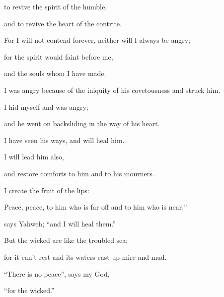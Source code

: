 {\par }{\QB to revive the spirit of the humble,
\par }{\QB and to revive the heart of the contrite.
\par }{\Q {}For I will not contend forever, neither will I always be angry;
\par }{\QB for the spirit would faint before me,
\par }{\QB and the souls whom I have made.
\par }{\Q {}I was angry because of the iniquity of his covetousness and struck him.
\par }{\QB I hid myself and was angry;
\par }{\QB and he went on backsliding in the way of his heart.
\par }{\Q {}I have seen his ways, and will heal him.
\par }{\QB I will lead him also,
\par }{\QB and restore comforts to him and to his mourners.
\par }{\Q {}I create the fruit of the lips:
\par }{\QB Peace, peace, to him who is far off and to him who is near,”
\par }{\QB says Yahweh; “and I will heal them.”
\par }{\Q {}But the wicked are like the troubled sea;
\par }{\QB for it can’t rest and its waters cast up mire and mud.
\par }{\Q {}“There is no peace”, says my God,
\par }{\QB “for the wicked.”

}
